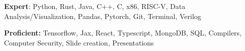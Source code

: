 \textbf{Expert}:
Python,
Rust,
Java,
C++,
C,
x86,
RISC-V,
Data Analysis/Visualization,
Pandas,
Pytorch,
Git,
Terminal,
Verilog

\textbf{Proficient:}
Tensorflow,
Jax,
React,
Typescript,
MongoDB,
SQL,
Compilers,
Computer Security,
Slide creation,
Presentations